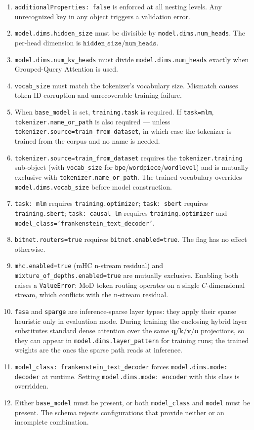 \begin{enumerate}[nosep]
    \item \texttt{additionalProperties: false} is enforced at all nesting levels. Any unrecognized key in any object triggers a validation error.
    \item \texttt{model.dims.hidden\_size} must be divisible by \texttt{model.dims.num\_heads}. The per-head dimension is $\texttt{hidden\_size} / \texttt{num\_heads}$.
    \item \texttt{model.dims.num\_kv\_heads} must divide \texttt{model.dims.num\_heads} exactly when Grouped-Query Attention is used.
    \item \texttt{vocab\_size} must match the tokenizer's vocabulary size. Mismatch causes token ID corruption and unrecoverable training failure.
    \item When \texttt{base\_model} is set, \texttt{training.task} is required. If \texttt{task=mlm}, \texttt{tokenizer.name\_or\_path} is also required --- unless \texttt{tokenizer.source=\allowbreak train\_from\_dataset}, in which case the tokenizer is trained from the corpus and no name is needed.
    \item \texttt{tokenizer.source=\allowbreak train\_from\_dataset} requires the \texttt{tokenizer.training} sub-object (with \texttt{vocab\_size} for \texttt{bpe}/\texttt{wordpiece}/\texttt{wordlevel}) and is mutually exclusive with \texttt{tokenizer.name\_or\_path}. The trained vocabulary overrides \texttt{model.dims.vocab\_size} before model construction.
    \item \texttt{task: mlm} requires \texttt{training.optimizer}; \texttt{task: sbert} requires \texttt{training.sbert}; \texttt{task: causal\_lm} requires \texttt{training.optimizer} and \texttt{model\_class='frankenstein\_text\_decoder'}.
    \item \texttt{bitnet.routers=true} requires \texttt{bitnet.enabled=true}. The flag has no effect otherwise.
    \item \texttt{mhc.enabled=true} (mHC n-stream residual) and \texttt{mixture\_of\_depths.enabled=true} are mutually exclusive. Enabling both raises a \texttt{ValueError}: MoD token routing operates on a single $C$-dimensional stream, which conflicts with the n-stream residual.
    \item \texttt{fasa} and \texttt{sparge} are inference-sparse layer types: they apply their sparse heuristic only in evaluation mode. During training the enclosing hybrid layer substitutes standard dense attention over the same $\mathbf{q}/\mathbf{k}/\mathbf{v}/\mathbf{o}$ projections, so they can appear in \texttt{model.dims.layer\_pattern} for training runs; the trained weights are the ones the sparse path reads at inference.
    \item \texttt{model\_class: frankenstein\_text\_decoder} forces \texttt{model.dims.mode: decoder} at runtime. Setting \texttt{model.dims.mode: encoder} with this class is overridden.
    \item Either \texttt{base\_model} must be present, or both \texttt{model\_class} and \texttt{model} must be present. The schema rejects configurations that provide neither or an incomplete combination.
\end{enumerate}
